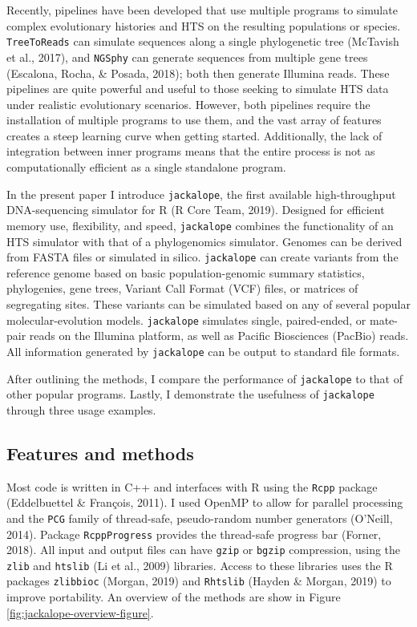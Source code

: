 \documentclass[12pt,]{article}
\begin{document}
Recently, pipelines have been developed that use multiple programs
to simulate complex evolutionary histories and HTS on the resulting populations
or species.
\texttt{TreeToReads} can simulate sequences along a single phylogenetic tree
(McTavish et al., 2017), and
\texttt{NGSphy} can generate sequences from multiple gene trees
(Escalona, Rocha, \& Posada, 2018);
both then generate Illumina reads.
These pipelines are quite powerful and useful to those seeking to simulate
HTS data under realistic evolutionary scenarios.
However, both pipelines require the installation of multiple programs to use them,
and the vast array of features creates a steep learning curve when getting started.
Additionally, the lack of integration between inner programs means that the
entire process is not as computationally efficient as a single standalone program.

In the present paper I introduce \texttt{jackalope}, the first available high-throughput
DNA-sequencing simulator for R
(R Core Team, 2019).
Designed for efficient memory use, flexibility, and speed,
\texttt{jackalope} combines the functionality of an HTS simulator with that of a
phylogenomics simulator.
Genomes can be derived from FASTA files or simulated in silico.
\texttt{jackalope} can create variants from the reference genome based on basic
population-genomic summary statistics, phylogenies, gene trees,
Variant Call Format (VCF) files, or matrices of segregating sites.
These variants can be simulated based on any of several popular
molecular-evolution models.
\texttt{jackalope} simulates single, paired-ended, or mate-pair reads on the Illumina platform,
as well as Pacific Biosciences (PacBio) reads.
All information generated by \texttt{jackalope} can be output to standard file formats.

After outlining the methods, I compare the performance of \texttt{jackalope} to that of
other popular programs.
Lastly, I demonstrate the usefulness of \texttt{jackalope} through three usage examples.

\hypertarget{features-and-methods}{%
\subsection{Features and methods}\label{features-and-methods}}

Most code is written in C++ and interfaces with R using the \texttt{Rcpp} package
(Eddelbuettel \& François, 2011).
I used OpenMP to allow for parallel processing and
the \texttt{PCG} family of thread-safe, pseudo-random number generators
(O'Neill, 2014).
Package \texttt{RcppProgress} provides the thread-safe progress bar
(Forner, 2018).
All input and output files can have \texttt{gzip} or \texttt{bgzip} compression, using the
\texttt{zlib} and
\texttt{htslib} (Li et al., 2009) libraries.
Access to these libraries uses the R packages
\texttt{zlibbioc} (Morgan, 2019) and
\texttt{Rhtslib} (Hayden \& Morgan, 2019)
to improve portability.
An overview of the methods are show in Figure \ref{fig:jackalope-overview-figure}.
\end{document}
